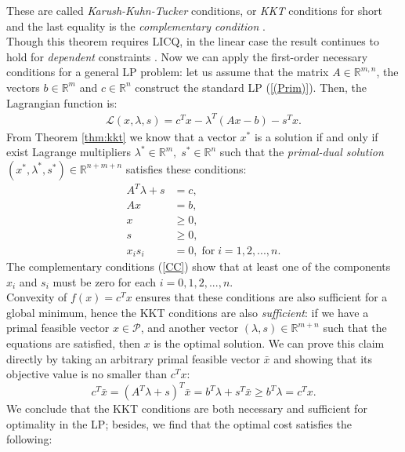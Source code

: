 \documentclass[a4paper,10 pt,titlepage,twoside]{report}
\theoremstyle{plain}
\theoremstyle{definition}
\theoremstyle{remark}
\begin{document}
These are called \textit{Karush-Kuhn-Tucker} conditions, or \textit{KKT} conditions for short and the last equality is the \textit{complementary condition} \cite{W}.\\ Though this theorem requires LICQ, in the linear case the result continues to hold for \textit{dependent} constraints \cite{W}. Now we can apply the first-order necessary conditions for a general LP problem: let us assume that the matrix $A\in\mathbb{R}^{m,n}$, the vectors $b\in\mathbb{R}^{m}$ and $c\in\mathbb{R}^{n}$ construct the standard LP (\ref{(Prim)}). Then, the Lagrangian function is:\\
\begin{align}\label{Lagrangian}
\mathcal{L}(x,\lambda,s)=c^{T}x-\lambda^{T}\left(Ax-b\right)-s^{T}x.
\end{align}
From Theorem \ref{thm:kkt} we know that a vector $x^{*}$ is a solution if and only if exist Lagrange multipliers $\lambda^{*}\in\mathbb{R}^{m},\;s^{*}\in\mathbb{R}^{n}$ such that the \textit{primal-dual solution} $\left( x^{*},\lambda^{*},s^{*}\right)\in\mathbb{R}^{n+m+n}$ satisfies these conditions: 
\begin{align*}
A^{T}\lambda+s&=c,\tag{2.6a}\label{DF}\\ 
Ax&=b,\tag{2.6b}\label{PF}\\ 
x&\geq 0,\tag{2.6c}\\
s&\geq 0,\tag{2.6d}\\
x_{i}s_{i}&=0,\; \text{for}\;i= 1,2,...,n.\label{CC} \tag{2.6e}
\end{align*} 
The complementary conditions (\ref{CC}) show that at least one of the components $x_{i}$ and $s_{i}$ must be zero for each $i=0,1,2,...,n$.\\
 Convexity of $f(x)= c^{T}x$ ensures that these conditions are also sufficient for a global minimum, hence the KKT conditions are also \textit{sufficient}: if we have a primal feasible vector $x\in\mathcal{P}$, and another vector $(\lambda, s)\in\mathbb{R}^{m+n}$ such that the equations are satisfied, then $x$ is the optimal solution. We can prove this claim directly by taking an arbitrary primal feasible vector $\bar{x}$ and showing that its objective value is no smaller than $c^{T}x$:
\begin{equation*}
c^{T}\bar{x}=(A^{T}\lambda+s)^{T}\bar{x}=b^{T}\lambda+s^{T}\bar{x}\geq b^{T}\lambda= c^{T}x.
\end{equation*}
We conclude that the KKT conditions are both necessary and sufficient for optimality in the LP; besides, we find that the optimal cost satisfies the following:
\end{document}
